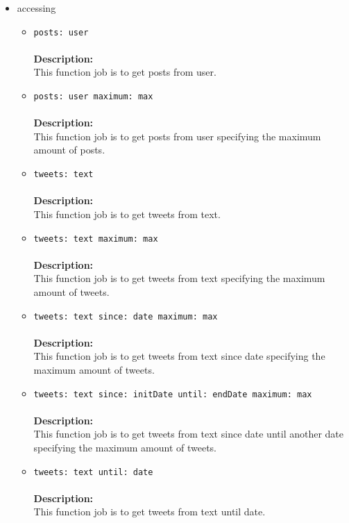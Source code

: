 \begin{itemize}
\begin{itemize}
\begin{itemize}
\item accessing
\label{sec-1-4-1-3-3-4}%
\begin{itemize}
\item \verb~posts: user~\\\\
\textbf{Description:}\\
      This function job is to get posts from user.\\
\item \verb~posts: user maximum: max~\\\\
\textbf{Description:}\\
      This function job is to get posts from user specifying the maximum amount of posts.\\
\item \verb~tweets: text~\\\\
\textbf{Description:}\\
      This function job is to get tweets from text.\\
\item \verb~tweets: text maximum: max~\\\\
\textbf{Description:}\\
      This function job is to get tweets from text specifying the maximum amount of tweets.\\
\item \verb~tweets: text since: date maximum: max~\\\\
\textbf{Description:}\\
      This function job is to get tweets from text since date specifying the maximum amount of tweets.\\
\item \verb~tweets: text since: initDate until: endDate maximum: max~\\\\
\textbf{Description:}\\
      This function job is to get tweets from text since date until another date specifying the maximum amount of tweets.\\
\item \verb~tweets: text until: date~\\\\
\textbf{Description:}\\
      This function job is to get tweets from text until date.\\

\end{itemize}
\end{itemize}
\end{itemize}
\end{itemize}
